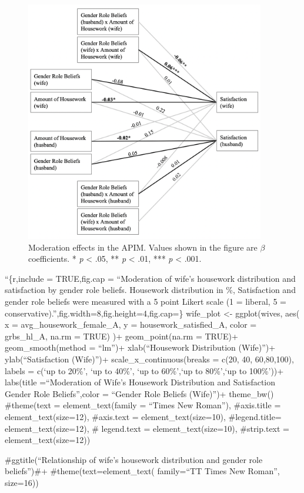 \documentclass[
  man,floatsintext]{apa6}
\begin{document}
\begin{figure}
\includegraphics[width=4.11in]{moderation} \caption{Moderation effects in the APIM. Values shown in the figure are \(\beta\) coefficients.
* \emph{p} \textless{} .05, ** \emph{p} \textless{} .01, *** \emph{p} \textless{} .001.}\label{fig:unnamed-chunk-9}
\end{figure}



``\{r,include = TRUE,fig.cap = ``Moderation of wife's housework distribution and satisfaction by gender role beliefs. Housework distribution in \%, Satisfaction and gender role beliefs were measured with a 5 point Likert scale (1 = liberal, 5 = conservative).'',fig.width=8,fig.height=4,fig.cap=\}
wife\_plot \textless- ggplot(wives, aes(
x = avg\_housework\_female\_A,
y = housework\_satisfied\_A,
color = grbs\_hl\_A, na.rm = TRUE)
)+
geom\_point(na.rm = TRUE)+
geom\_smooth(method = ``lm'')+
xlab(``Housework Distribution (Wife)'')+
ylab(``Satisfaction (Wife)'')+
scale\_x\_continuous(breaks = c(20, 40, 60,80,100), labels = c(`up to 20\%', `up to 40\%', `up to 60\%',`up to 80\%',`up to 100\%'))+
labs(title =``Moderation of Wife's Housework Distribution and Satisfaction \nby Gender Role Beliefs'',color = ``Gender Role Beliefs \n(Wife)'')+
theme\_bw()
\#theme(text = element\_text(family = ``Times New Roman''),
\#axis.title = element\_text(size=12),
\#axis.text = element\_text(size=10),
\#legend.title= element\_text(size=12),
\# legend.text = element\_text(size=10),
\#strip.text = element\_text(size=12))

\#ggtitle(``Relationship of wife's housework distribution and gender role beliefs'')\#+
\#theme(text=element\_text( family=``TT Times New Roman'', size=16))
\end{document}
